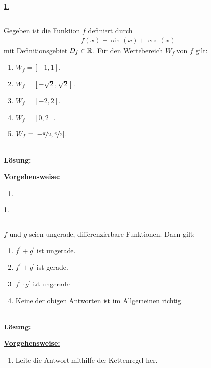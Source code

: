 \underline{1. }\\

\newpage
\subsection*{}
Gegeben ist die Funktion $ f $ definiert durch
\begin{align*}
	f(x) = \sin(x) + \cos(x)
\end{align*}
mit Definitionsgebiet $ D_f \in \mathbb{R} $. Für den Wertebereich $ W_f $ von $ f $ gilt:
\renewcommand{\labelenumi}{(\alph{enumi})}
\begin{enumerate}
	\item 
	$ W_f = [-1,1] $.
	\item
	$ W_f = [-\sqrt{2},\sqrt{2}] $.
	\item
	$ W_f = [-2,2] $.
	\item
	$ W_f = [0,2] $.
	\item
	$ W_f = [-\nicefrac{\pi }{2}, \nicefrac{\pi }{2}] $.
\end{enumerate}
\ \\
\textbf{Lösung:}
\begin{mdframed}
\underline{\textbf{Vorgehensweise:}}
\renewcommand{\labelenumi}{\theenumi.}
\begin{enumerate}
\item 
\end{enumerate}
\end{mdframed}

\underline{1. }\\

\newpage

\subsection*{}
$ f $ und $ g $ seien ungerade, differenzierbare Funktionen. Dann gilt:
\renewcommand{\labelenumi}{(\alph{enumi})}
\begin{enumerate}
	\item 
	$ f^\prime + g^\prime $ ist ungerade.
	\item
	$ f^\prime + g^\prime $ ist gerade.
	\item
	$ f^\prime \cdot g^\prime $ ist ungerade.
	\item
	Keine der obigen Antworten ist im Allgemeinen richtig.
\end{enumerate}
\ \\
\textbf{Lösung:}
\begin{mdframed}
\underline{\textbf{Vorgehensweise:}}
\renewcommand{\labelenumi}{\theenumi.}
\begin{enumerate}
\item Leite die Antwort mithilfe der Kettenregel her.
\end{enumerate}
\end{mdframed}

